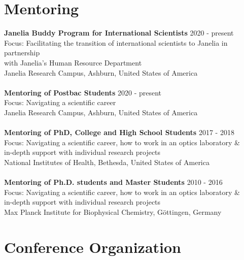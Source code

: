 \documentclass[margin,line]{res}
\begin{document}
\begin{resume}

\section{\sc Mentoring}

{\bf  Janelia Buddy Program for International Scientists} \hfill 2020 - present\\
Focus: Facilitating the transition of international scientists to Janelia in partnership \\
with Janelia's Human Resource Department\\
Janelia Research Campus, Ashburn, United States of America\\
\vspace*{-3mm}\\
{\bf  Mentoring of Postbac Students} \hfill 2020 - present\\
Focus: Navigating a scientific career\\
Janelia Research Campus, Ashburn, United States of America\\
\vspace*{-3mm}\\
{\bf  Mentoring of PhD, College and High School Students}  \hfill 2017 - 2018\\
Focus: Navigating a scientific career, how to work in an optics laboratory \&\\
in-depth support with individual research projects\\
National Institutes of Health, Bethesda, United States of America\\
\vspace*{-3mm}\\
{\bf Mentoring of Ph.D. students and Master Students}  \hfill {2010 - 2016}\\
Focus: Navigating a scientific career, how to work in an optics laboratory \&\\
in-depth support with individual research projects\\
Max Planck Institute for Biophysical Chemistry, Göttingen, Germany \\


\section{\sc Conference Organization}


\end{resume}
\end{document}
